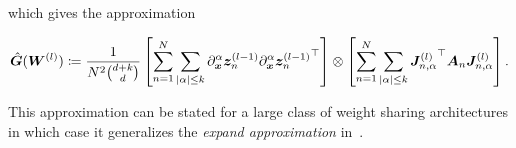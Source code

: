 which gives the approximation
\begin{tcolorbox}[colframe=kfac, title={KFAC with general PDE terms},bottom=0mm,top=0mm,middle=0mm]
\begin{align*}\label{eq:KFAC-PINNs-general-app}
    \hat{\mG}%
    (\mW^{(l)})
    \coloneqq \frac{1}{N^2\binom{d+k}{d} }
    \left[\sum_{n=1}^N \sum_{\lvert \alpha \rvert \le k} %
    \partial_\vx^\alpha \vz_n^{(l-1)} {\partial_\vx^\alpha \vz_n^{(l-1)}}^\top\right]
    \otimes
    \left[\sum_{n=1}^N\sum_{\lvert \alpha \rvert \le k} {\mJ^{(l)}_{n,\alpha}}^\top \mA_n {\mJ^{(l)}_{n,\alpha}} \right].
\end{align*}
\end{tcolorbox}


This approximation can be stated for a large class of weight sharing architectures in which case it generalizes the \emph{expand approximation} in~\citet{eschenhagen2023kroneckerfactored}.


%

